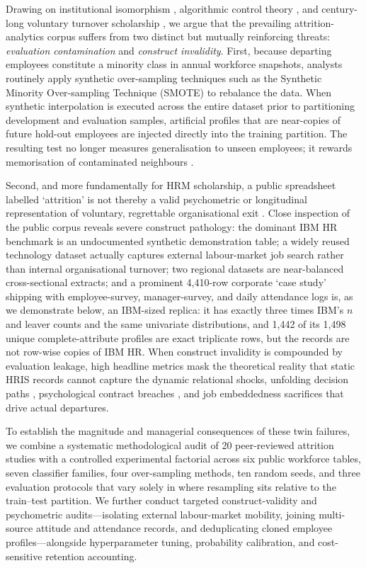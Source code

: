 \documentclass[12pt,a4paper]{article}
\begin{document}
Drawing on institutional isomorphism \parencite{ref59,ref51}, algorithmic control theory \parencite{ref58,ref61}, and century-long voluntary turnover scholarship \parencite{ref36,ref46,ref48,ref62}, we argue that the prevailing attrition-analytics corpus suffers from two distinct but mutually reinforcing threats: \textit{evaluation contamination} and \textit{construct invalidity}. First, because departing employees constitute a minority class in annual workforce snapshots, analysts routinely apply synthetic over-sampling techniques such as the Synthetic Minority Over-sampling Technique (SMOTE) \parencite{ref5,ref6,ref7} to rebalance the data. When synthetic interpolation is executed across the entire dataset prior to partitioning development and evaluation samples, artificial profiles that are near-copies of future hold-out employees are injected directly into the training partition. The resulting test no longer measures generalisation to unseen employees; it rewards memorisation of contaminated neighbours \parencite{ref12,ref13,ref14,ref21}.

Second, and more fundamentally for HRM scholarship, a public spreadsheet labelled `attrition' is not thereby a valid psychometric or longitudinal representation of voluntary, regrettable organisational exit \parencite{ref36,ref62}. Close inspection of the public corpus reveals severe construct pathology: the dominant IBM HR benchmark is an undocumented synthetic demonstration table; a widely reused technology dataset actually captures external labour-market job search rather than internal organisational turnover; two regional datasets are near-balanced cross-sectional extracts; and a prominent 4,410-row corporate `case study' shipping with employee-survey, manager-survey, and daily attendance logs is, as we demonstrate below, an IBM-sized replica: it has exactly three times IBM's $n$ and leaver counts and the same univariate distributions, and 1,442 of its 1,498 unique complete-attribute profiles are exact triplicate rows, but the records are not row-wise copies of IBM HR. When construct invalidity is compounded by evaluation leakage, high headline metrics mask the theoretical reality that static HRIS records cannot capture the dynamic relational shocks, unfolding decision paths \parencite{ref46}, psychological contract breaches \parencite{ref47}, and job embeddedness sacrifices \parencite{ref48} that drive actual departures.

To establish the magnitude and managerial consequences of these twin failures, we combine a systematic methodological audit of 20 peer-reviewed attrition studies with a controlled experimental factorial across six public workforce tables, seven classifier families, four over-sampling methods, ten random seeds, and three evaluation protocols that vary solely in where resampling sits relative to the train--test partition. We further conduct targeted construct-validity and psychometric audits---isolating external labour-market mobility, joining multi-source attitude and attendance records, and deduplicating cloned employee profiles---alongside hyperparameter tuning, probability calibration, and cost-sensitive retention accounting.
\end{document}
